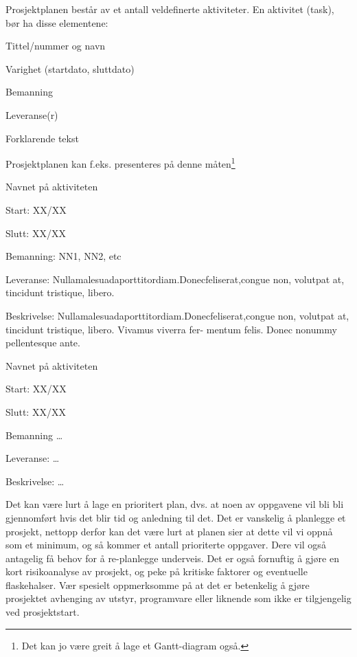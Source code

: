 \documentclass[11pt,a4paper]{report}
\begin{document}
Prosjektplanen består av et antall veldefinerte aktiviteter. En aktivitet (task), bør ha disse elementene: 

\begin{compactitem}
\item Tittel/nummer og navn
\item Varighet (startdato, sluttdato)
\item Bemanning 
\item Leveranse(r)
\item Forklarende tekst
\end{compactitem}

Prosjektplanen kan f.eks. presenteres på denne måten\footnote{Det kan jo være greit å lage et Gantt-diagram også.}

\begin{compactdesc}
\item [Aktivitetet 1:] Navnet på aktiviteten
	\begin{compactitem}
	\item Start: XX/XX
	\item Slutt: XX/XX
	\item Bemanning: NN1, NN2, etc
	\item Leveranse: Nullamalesuadaporttitordiam.Donecfeliserat,congue
non, volutpat at, tincidunt tristique, libero. 
	\item Beskrivelse: Nullamalesuadaporttitordiam.Donecfeliserat,congue
non, volutpat at, tincidunt tristique, libero. Vivamus viverra fer- mentum felis. Donec nonummy pellentesque ante. 
	\end{compactitem}
	\item [Aktivitetet X:.] Navnet på aktiviteten
	\begin{compactitem}
	\item Start: XX/XX
	\item Slutt: XX/XX
	\item Bemanning \dots
	\item Leveranse: \dots
	\item Beskrivelse: \dots
	\end{compactitem}

\end{compactdesc}


Det kan være lurt å lage en prioritert plan, dvs. at noen av oppgavene vil bli bli gjennomført hvis det blir tid og anledning til det. Det er vanskelig å planlegge et prosjekt, nettopp derfor kan det være lurt at planen sier at dette vil vi oppnå som et minimum, og så kommer et antall prioriterte oppgaver. Dere vil også antagelig få behov for å re-planlegge underveis.  Det er også fornuftig å gjøre en kort risikoanalyse av prosjekt, og peke på kritiske faktorer og eventuelle flaskehalser. Vær spesielt oppmerksomme på at det er betenkelig å gjøre prosjektet avhenging av utstyr, programvare eller liknende som ikke er tilgjengelig ved prosjektstart.
\end{document}
